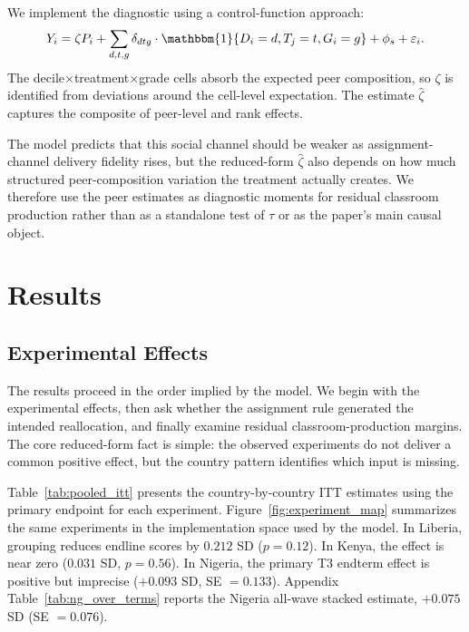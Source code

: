 \documentclass[11pt]{article}
\newcommand{\ind}{\mathbbm{1}}
\begin{document}
We implement the diagnostic using a control-function approach:
\begin{equation}
\label{eq:bh}
Y_i = \zeta P_i + \sum_{d,t,g} \delta_{dtg} \cdot \ind\{D_i = d, T_j = t, G_i = g\} + \phi_s + \varepsilon_i.
\end{equation}
The decile$\times$treatment$\times$grade cells absorb the expected peer composition, so $\zeta$ is identified from deviations around the cell-level expectation. The estimate $\hat{\zeta}$ captures the composite of peer-level and rank effects.

The model predicts that this social channel should be weaker as assignment-channel delivery fidelity rises, but the reduced-form $\hat{\zeta}$ also depends on how much structured peer-composition variation the treatment actually creates. We therefore use the peer estimates as diagnostic moments for residual classroom production rather than as a standalone test of $\tau$ or as the paper's main causal object.

\section{Results}
\label{sec:results}

\subsection{Experimental Effects}

The results proceed in the order implied by the model. We begin with the experimental effects, then ask whether the assignment rule generated the intended reallocation, and finally examine residual classroom-production margins. The core reduced-form fact is simple: the observed experiments do not deliver a common positive effect, but the country pattern identifies which input is missing.

Table~\ref{tab:pooled_itt} presents the country-by-country ITT estimates using the primary endpoint for each experiment. Figure~\ref{fig:experiment_map} summarizes the same experiments in the implementation space used by the model. In Liberia, grouping reduces endline scores by $0.212$ SD ($p = 0.12$). In Kenya, the effect is near zero ($0.031$ SD, $p = 0.56$). In Nigeria, the primary T3 endterm effect is positive but imprecise ($+0.093$ SD, SE $=0.133$). Appendix Table~\ref{tab:ng_over_terms} reports the Nigeria all-wave stacked estimate, $+0.075$ SD (SE $=0.076$).
\end{document}
